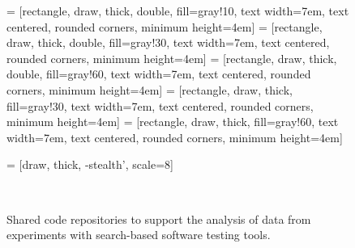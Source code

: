 
\begin{figure*}

  \begin{center}


     = [rectangle, draw, thick, double, fill=gray!10, text width=7em, text centered, rounded corners, minimum height=4em]
     = [rectangle, draw, thick, double, fill=gray!30, text width=7em, text centered, rounded corners, minimum height=4em]
     = [rectangle, draw, thick, double, fill=gray!60, text width=7em, text centered, rounded corners, minimum height=4em]
     = [rectangle, draw, thick, fill=gray!30, text width=7em, text centered, rounded corners, minimum height=4em]
     = [rectangle, draw, thick, fill=gray!60, text width=7em, text centered, rounded corners, minimum height=4em]


     = [draw, thick, -stealth', scale=8]


  \end{center}

  \caption{Shared code repositories to support the analysis of data from experiments with search-based software testing
  tools.}~\label{fig:statistical_repositories}

\end{figure*}
